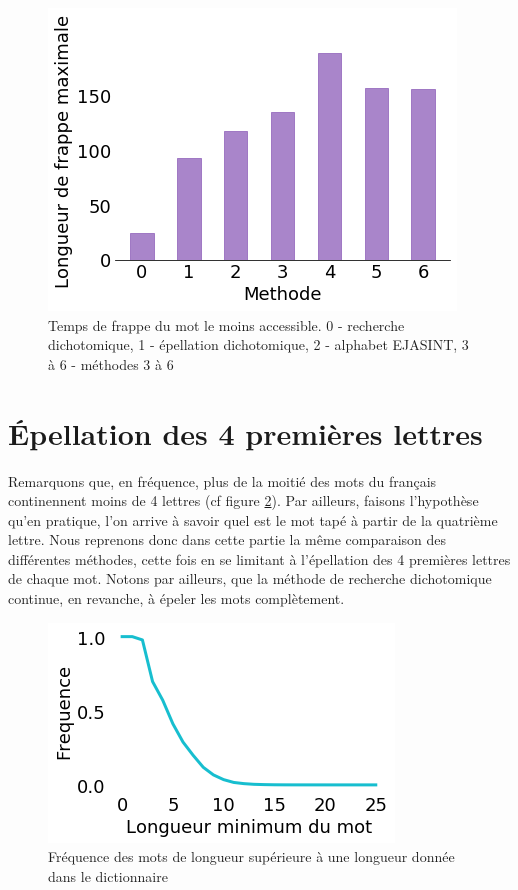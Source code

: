 \documentclass[twoside,twocolumn]{article}
\begin{document}
\begin{center}
\begin{figure}
  \includegraphics[scale=0.5]{frappe-maxi.png}
  \caption{Temps de frappe du mot le moins accessible. 0 - recherche dichotomique, 1 - épellation dichotomique, 2 - alphabet EJASINT, 3 à 6 - méthodes 3 à 6}
  \label{maxi}
\end{figure}
\end{center}

\section{Épellation des 4 premières lettres}

Remarquons que, en fréquence, plus de la moitié des mots du français continennent moins de 4 lettres (cf figure \ref{dico}). Par ailleurs, faisons l'hypothèse qu'en pratique, l'on arrive à savoir quel est le mot tapé à partir de la quatrième lettre. Nous reprenons donc dans cette partie la même comparaison des différentes méthodes, cette fois en se limitant à l'épellation des 4 premières lettres de chaque mot. Notons par ailleurs, que la méthode de recherche dichotomique continue, en revanche, à épeler les mots complètement.

\begin{center}
\begin{figure}
  \includegraphics[scale=0.55]{dico.png}
  \caption{Fréquence des mots de longueur supérieure à une longueur donnée dans le dictionnaire}
  \label{dico}
\end{figure}
\end{center}
\end{document}
